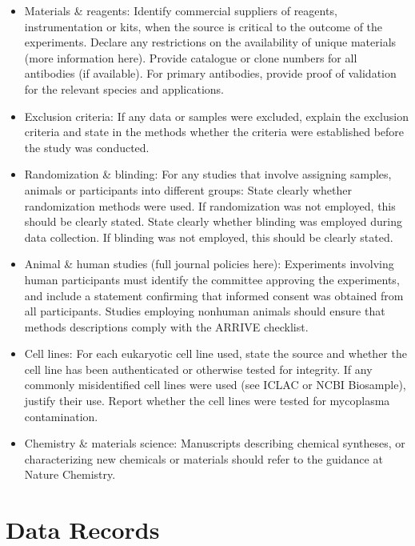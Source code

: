 \documentclass[fleqn,10pt]{wlscirep}
\begin{document}
\begin{itemize}
  \item
  Materials \& reagents:
  Identify commercial suppliers of reagents, instrumentation or kits, when the source is critical to the outcome of the experiments.
  Declare any restrictions on the availability of unique materials (more information here).
  Provide catalogue or clone numbers for all antibodies (if available). For primary antibodies, provide proof of validation for the relevant species and applications.
  
  \item
  Exclusion criteria: If any data or samples were excluded, explain the exclusion criteria and state in the methods whether the criteria were established before the study was conducted.
  
  \item
  Randomization \& blinding: For any studies that involve assigning samples, animals or participants into different groups:
  State clearly whether randomization methods were used. If randomization was not employed, this should be clearly stated.
  State clearly whether blinding was employed during data collection. If blinding was not employed, this should be clearly stated.
  
  \item
  Animal \& human studies (full journal policies here):
  Experiments involving human participants must identify the committee approving the experiments, and include a statement confirming that informed consent was obtained from all participants.
  Studies employing nonhuman animals should ensure that methods descriptions comply with the ARRIVE checklist.
  
  \item
  Cell lines:
  For each eukaryotic cell line used, state the source and whether the cell line has been authenticated or otherwise tested for integrity.
  If any commonly misidentified cell lines were used (see ICLAC or NCBI Biosample), justify their use.
  Report whether the cell lines were tested for mycoplasma contamination.
  
  \item
  Chemistry \& materials science: Manuscripts describing chemical syntheses, or characterizing new chemicals or materials should refer to the guidance at Nature Chemistry.
  
\end{itemize}

\section*{Data Records}
\end{document}
